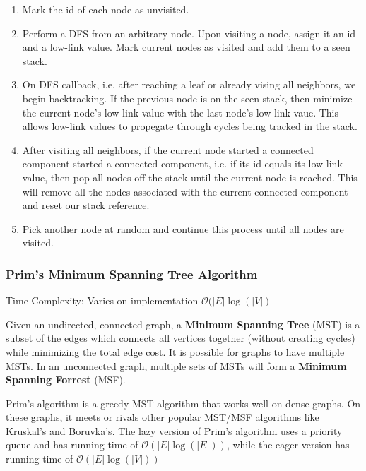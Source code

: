 \documentclass{article}
\newcommand{\bigO}{\mathcal{O}}
\begin{document}
    \begin{enumerate}
        \item Mark the id of each node as unvisited.
        \item Perform a DFS from an arbitrary node. Upon visiting a node, assign it an id and a low-link value. Mark current nodes as visited and add them to a seen stack.
        \item On DFS callback, i.e. after reaching a leaf or already vising all neighbors, we begin backtracking. If the previous node is on the seen stack, then minimize the current node's low-link value with the last node's low-link vaue. This allows low-link values to propegate through cycles being tracked in the stack.
        \item After visiting all neighbors, if the current node started a connected component started a connected component, i.e. if its id equals its low-link value, then pop all nodes off the stack until the current node is reached. This will remove all the nodes associated with the current connected component and reset our stack reference.
        \item Pick another node at random and continue this process until all nodes are visited.
    \end{enumerate}
    
    \subsubsection{Prim's Minimum Spanning Tree Algorithm}
    Time Complexity: Varies on implementation $\bigO(|E|\log(|V|)$
    
    Given an undirected, connected graph, a \textbf{Minimum Spanning Tree} (MST) is a subset of the edges which connects all vertices together (without creating cycles) while minimizing the total edge cost. It is possible for graphs to have multiple MSTs. In an unconnected graph, multiple sets of MSTs will form a \textbf{Minimum Spanning Forrest} (MSF).
    
    Prim's algorithm is a greedy MST algorithm that works well on dense graphs. On these graphs, it meets or rivals other popular MST/MSF algorithms like Kruskal's and Boruvka's. The lazy version of Prim's algorithm uses a priority queue and has running time of $\bigO(|E| \log(|E|))$, while the eager version has running time of $\bigO(|E| \log(|V|))$ 
    
\end{document}

